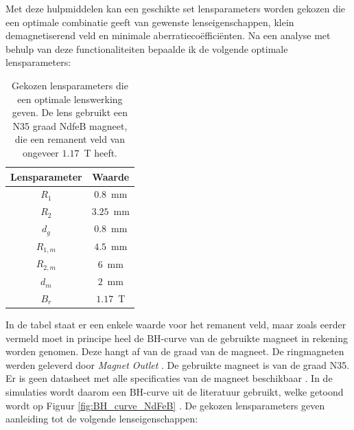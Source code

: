 \documentclass[we,twoside,openright,a4paper,11pt]{uantwerpenbamathesis}
\begin{document}
Met deze hulpmiddelen kan een geschikte set lensparameters worden gekozen die een optimale combinatie geeft van gewenste lenseigenschappen, klein demagnetiserend veld en minimale aberratiecoëfficiënten. Na een analyse met behulp van deze functionaliteiten bepaalde ik de volgende optimale lensparameters:
\begin{table}[H]
\centering
\begin{tabular}{@{}cl@{}}
\toprule
Lensparameter                     & \multicolumn{1}{c}{Waarde}  \\ \midrule
\multicolumn{1}{|c|}{$R_1$}        & \multicolumn{1}{c|}{$0.8$~mm}  \\ \midrule
\multicolumn{1}{|c|}{$R_2$}        & \multicolumn{1}{c|}{$3.25$~mm} \\ \midrule
\multicolumn{1}{|c|}{$d_g$}        & \multicolumn{1}{c|}{$0.8$~mm}  \\ \midrule
\multicolumn{1}{|c|}{$R_{1, m}$} & \multicolumn{1}{c|}{$4.5$~mm}  \\ \midrule
\multicolumn{1}{|c|}{$R_{2, m}$} & \multicolumn{1}{c|}{$6$~mm}    \\ \midrule
\multicolumn{1}{|c|}{$d_m$}        & \multicolumn{1}{c|}{$2$~mm}    \\ \midrule
\multicolumn{1}{|c|}{$B_r$}        & \multicolumn{1}{c|}{$1.17$~T} \\ \midrule
\end{tabular}
\caption{Gekozen lensparameters die een optimale lenswerking geven. De lens gebruikt een N35 graad NdfeB magneet, die een remanent veld van ongeveer $1.17$~T heeft.}\label{tab:lens_parameters}
\end{table}
In de tabel staat er een enkele waarde voor het remanent veld, maar zoals eerder vermeld moet in principe heel de $\mathrm{BH}$-curve van de gebruikte magneet in rekening worden genomen. Deze hangt af van de graad van de magneet. De ringmagneten werden geleverd door \textit{Magnet Outlet} \cite{Magnet_Outlet}. De gebruikte magneet is van de graad N35. Er is geen datasheet met alle specificaties van de magneet beschikbaar \cite{Magnet_Grade}. In de simulaties wordt daarom een $\mathrm{BH}$-curve uit de literatuur gebruikt, welke getoond wordt op Figuur \ref{fig:BH_curve_NdFeB} \cite{arnold_ndfeb_2019}. De gekozen lensparameters geven aanleiding tot de volgende lenseigenschappen:
\end{document}
